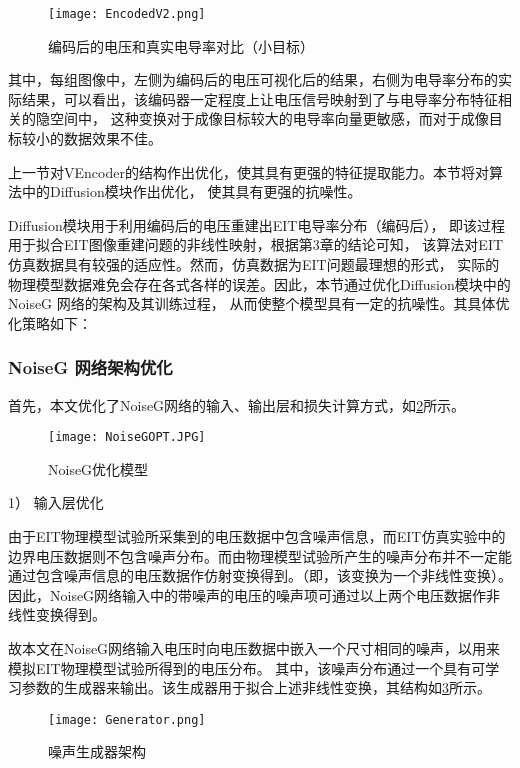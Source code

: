 \begin{figure}[H]
    \centering
    \texttt{[image: EncodedV2.png]}
    \caption{编码后的电压和真实电导率对比（小目标）}
    \label{figure:EncodedV2}
\end{figure}

其中，每组图像中，左侧为编码后的电压可视化后的结果，右侧为电导率分布的实际结果，可以看出，该编码器一定程度上让电压信号映射到了与电导率分布特征相关的隐空间中，
这种变换对于成像目标较大的电导率向量更敏感，而对于成像目标较小的数据效果不佳。


上一节对VEncoder的结构作出优化，使其具有更强的特征提取能力。本节将对算法中的Diffusion模块作出优化，
使其具有更强的抗噪性。

Diffusion模块用于利用编码后的电压重建出EIT电导率分布（编码后），
即该过程用于拟合EIT图像重建问题的非线性映射，根据第3章的结论可知，
该算法对EIT仿真数据具有较强的适应性。然而，仿真数据为EIT问题最理想的形式，
实际的物理模型数据难免会存在各式各样的误差。因此，本节通过优化Diffusion模块中的NoiseG 网络的架构及其训练过程，
从而使整个模型具有一定的抗噪性。其具体优化策略如下：

\subsubsection{NoiseG 网络架构优化}
 
首先，本文优化了NoiseG网络的输入、输出层和损失计算方式，如\cref{figure:NoiseGOPT}所示。
\begin{figure}[h]
    \centering
    \texttt{[image: NoiseGOPT.JPG]}
    \caption{NoiseG优化模型}
    \label{figure:NoiseGOPT}
\end{figure}

1） 输入层优化
 
由于EIT物理模型试验所采集到的电压数据中包含噪声信息，而EIT仿真实验中的边界电压数据则不包含噪声分布。而由物理模型试验所产生的噪声分布并不一定能通过包含噪声信息的电压数据作仿射变换得到。（即，该变换为一个非线性变换）。因此，NoiseG网络输入中的带噪声的电压的噪声项可通过以上两个电压数据作非线性变换得到。

 
故本文在NoiseG网络输入电压时向电压数据中嵌入一个尺寸相同的噪声，以用来模拟EIT物理模型试验所得到的电压分布。
其中，该噪声分布通过一个具有可学习参数的生成器来输出。该生成器用于拟合上述非线性变换，其结构如\cref{figure:Generator}所示。

\begin{figure}[h]
    \centering
    \texttt{[image: Generator.png]}
    \caption{噪声生成器架构}
    \label{figure:Generator}
\end{figure}


